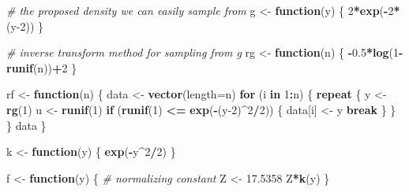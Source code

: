 \documentclass[
]{article}
\newenvironment{Shaded}{\begin{snugshade}}{\end{snugshade}}
\newcommand{\AttributeTok}[1]{\textcolor[rgb]{0.13,0.29,0.53}{#1}}
\newcommand{\CommentTok}[1]{\textcolor[rgb]{0.56,0.35,0.01}{\textit{#1}}}
\newcommand{\ControlFlowTok}[1]{\textcolor[rgb]{0.13,0.29,0.53}{\textbf{#1}}}
\newcommand{\DecValTok}[1]{\textcolor[rgb]{0.00,0.00,0.81}{#1}}
\newcommand{\FloatTok}[1]{\textcolor[rgb]{0.00,0.00,0.81}{#1}}
\newcommand{\FunctionTok}[1]{\textcolor[rgb]{0.13,0.29,0.53}{\textbf{#1}}}
\newcommand{\NormalTok}[1]{#1}
\newcommand{\OtherTok}[1]{\textcolor[rgb]{0.56,0.35,0.01}{#1}}
\newcommand{\SpecialCharTok}[1]{\textcolor[rgb]{0.81,0.36,0.00}{\textbf{#1}}}
\begin{document}
\begin{Shaded}
\begin{Highlighting}[]
\CommentTok{\# the proposed density we can easily sample from}
\NormalTok{g }\OtherTok{\textless{}{-}} \ControlFlowTok{function}\NormalTok{(y)}
\NormalTok{\{}
  \DecValTok{2}\SpecialCharTok{*}\FunctionTok{exp}\NormalTok{(}\SpecialCharTok{{-}}\DecValTok{2}\SpecialCharTok{*}\NormalTok{(y}\DecValTok{{-}2}\NormalTok{))}
\NormalTok{\}}

\CommentTok{\# inverse transform method for sampling from g}
\NormalTok{rg }\OtherTok{\textless{}{-}} \ControlFlowTok{function}\NormalTok{(n)}
\NormalTok{\{}
  \SpecialCharTok{{-}}\FloatTok{0.5}\SpecialCharTok{*}\FunctionTok{log}\NormalTok{(}\DecValTok{1}\SpecialCharTok{{-}}\FunctionTok{runif}\NormalTok{(n))}\SpecialCharTok{+}\DecValTok{2}
\NormalTok{\}}

\NormalTok{rf }\OtherTok{\textless{}{-}} \ControlFlowTok{function}\NormalTok{(n)}
\NormalTok{\{}
\NormalTok{  data }\OtherTok{\textless{}{-}} \FunctionTok{vector}\NormalTok{(}\AttributeTok{length=}\NormalTok{n)}
  \ControlFlowTok{for}\NormalTok{ (i }\ControlFlowTok{in} \DecValTok{1}\SpecialCharTok{:}\NormalTok{n)}
\NormalTok{  \{}
    \ControlFlowTok{repeat}
\NormalTok{    \{}
\NormalTok{      y }\OtherTok{\textless{}{-}} \FunctionTok{rg}\NormalTok{(}\DecValTok{1}\NormalTok{)}
\NormalTok{      u }\OtherTok{\textless{}{-}} \FunctionTok{runif}\NormalTok{(}\DecValTok{1}\NormalTok{)}
      \ControlFlowTok{if}\NormalTok{ (}\FunctionTok{runif}\NormalTok{(}\DecValTok{1}\NormalTok{) }\SpecialCharTok{\textless{}=} \FunctionTok{exp}\NormalTok{(}\SpecialCharTok{{-}}\NormalTok{(y}\DecValTok{{-}2}\NormalTok{)}\SpecialCharTok{\^{}}\DecValTok{2}\SpecialCharTok{/}\DecValTok{2}\NormalTok{))}
\NormalTok{      \{}
\NormalTok{        data[i] }\OtherTok{\textless{}{-}}\NormalTok{ y}
        \ControlFlowTok{break}
\NormalTok{      \}}
\NormalTok{    \}}
\NormalTok{  \}}
\NormalTok{  data}
\NormalTok{\}}

\NormalTok{k }\OtherTok{\textless{}{-}} \ControlFlowTok{function}\NormalTok{(y)}
\NormalTok{\{}
  \FunctionTok{exp}\NormalTok{(}\SpecialCharTok{{-}}\NormalTok{y}\SpecialCharTok{\^{}}\DecValTok{2}\SpecialCharTok{/}\DecValTok{2}\NormalTok{)}
\NormalTok{\}}

\NormalTok{f }\OtherTok{\textless{}{-}} \ControlFlowTok{function}\NormalTok{(y)}
\NormalTok{\{}
  \CommentTok{\# normalizing constant}
\NormalTok{  Z }\OtherTok{\textless{}{-}} \FloatTok{17.5358}
\NormalTok{  Z}\SpecialCharTok{*}\FunctionTok{k}\NormalTok{(y)}
\NormalTok{\}}
\end{Highlighting}
\end{Shaded}
\end{document}
